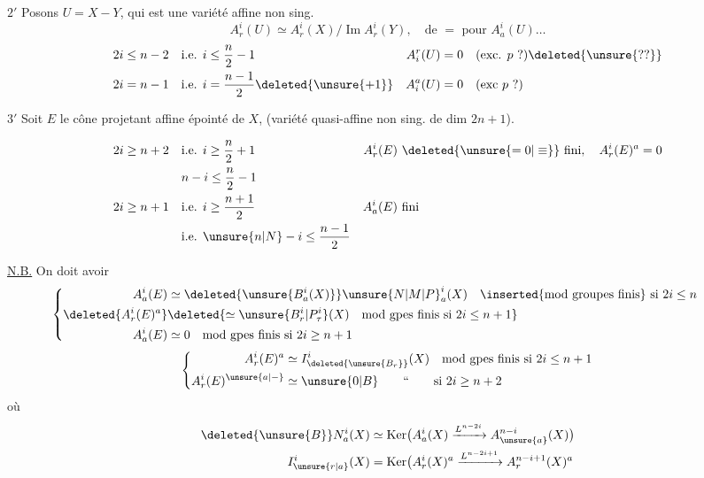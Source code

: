 \textcircled{$2'$} Posons $U=X-Y$, qui est une variété affine non sing.
\[
 A^i_r(U)\simeq A^i_r(X)/\operatorname{Im} A^i_r(Y),\quad
 \text{de }=\text{ pour } A^i_a(U)\ldots
\]
\[
\begin{aligned}
 2i\leq n-2&\quad\text{i.e. }i\leq\frac n2-1&
 A_i^r(U)&=0\quad(\text{exc. $p$ ?})\deleted{\unsure{??}}\\
 2i=n-1&\quad\text{i.e. }i=\frac{n-1}2\deleted{\unsure{+1}}&
 A_i^a(U)&=0\quad(\text{exc $p$ ?})
\end{aligned}
\]

\textcircled{$3'$} Soit $E$ le cône projetant affine épointé de $X$, (variété quasi-affine non sing. de dim $2n+1$).

\[
\begin{aligned}
 2i\geq n+2&\quad\text{i.e. } i\geq\frac n2+1&
 A_r^i(E)&\ \deleted{\unsure{=0|\equiv}}\text{ fini},\quad A^i_r(E)^a=0\\
 &\quad n-i\leq\frac n2-1\\
 2i\geq n+1&\quad\text{i.e. } i\geq\frac{n+1}2&
 A^i_a(E)&\ \text{fini}\\
 &\quad\text{i.e. }\unsure{n|N}-i\leq\frac{n-1}2
\end{aligned}
\]

\uline{N.B.} On doit avoir
\[
\left\{\begin{aligned}
 A_a^i(E)&\simeq\deleted{\unsure{B_a^i(X)}}\unsure{N|M|P}_a^i(X)
 \quad\text{\inserted{mod groupes finis} si }2i\leq n\\
 \deleted{A_r^i(E)^a}&\deleted{\simeq\unsure{B_r^i|P^i_{\tau}}(X)\quad\text{mod gpes finis si }2i\leq n+1}\\
 A_a^i(E)&\simeq0\quad\text{mod gpes finis si }2i\geq n+1
\end{aligned}\right.
\qquad
\]
\[
\left\{\begin{aligned}
 A_r^i(E)^a&\simeq I^{i}_{\deleted{\unsure{B_r}}}(X)\quad\text{mod gpes finis si }2i\leq n+1\\
 A_r^i(E)^{\unsure{a|-}}&\simeq\unsure{0|B}\qquad\text{``}\qquad\text{si }2i\geq n+2
\end{aligned}\right.
\]
où
\[
\begin{aligned}
 \deleted{\unsure{B}}N^i_a(X)&\simeq\operatorname{Ker}\bigl(A^i_a(X)\xrightarrow{L^{n-2i}}A^{n-i}_{\unsure{a}}(X)\bigr)\\
 I^i_{\unsure{r|a}}(X)&=\operatorname{Ker}\bigl(A^i_r(X)^a\xrightarrow{L^{n-2i+1}}A^{n-i+1}_r(X)^a
\end{aligned}
\]
